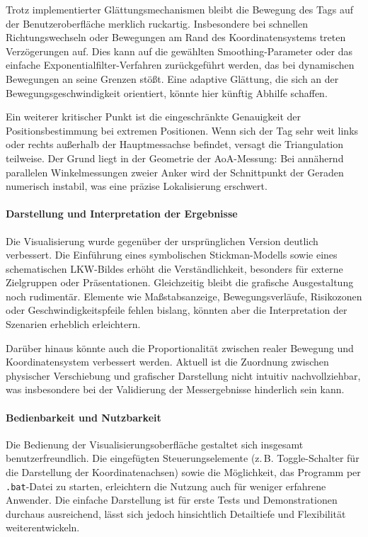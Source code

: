 \documentclass[a4paper, 12pt]{article} %
\begin{document}
Trotz implementierter Glättungsmechanismen bleibt die Bewegung des Tags auf der Benutzeroberfläche merklich ruckartig. Insbesondere bei 
schnellen Richtungswechseln oder Bewegungen am Rand des Koordinatensystems treten Verzögerungen auf. Dies kann auf die gewählten Smoothing-Parameter 
oder das einfache Exponentialfilter-Verfahren zurückgeführt werden, das bei dynamischen Bewegungen an seine Grenzen stößt. Eine adaptive Glättung, die 
sich an der Bewegungsgeschwindigkeit orientiert, könnte hier künftig Abhilfe schaffen.

Ein weiterer kritischer Punkt ist die eingeschränkte Genauigkeit der Positionsbestimmung bei extremen Positionen. Wenn sich der Tag sehr weit 
links oder rechts außerhalb der Hauptmessachse befindet, versagt die Triangulation teilweise. Der Grund liegt in der Geometrie der \ac{AoA}-Messung: 
Bei annähernd parallelen Winkelmessungen zweier Anker wird der Schnittpunkt der Geraden numerisch instabil, was eine präzise Lokalisierung erschwert.

\paragraph{Darstellung und Interpretation der Ergebnisse}

Die Visualisierung wurde gegenüber der ursprünglichen Version deutlich verbessert. Die Einführung eines symbolischen Stickman-Modells sowie 
eines schematischen \ac{LKW}-Bildes erhöht die Verständlichkeit, besonders für externe Zielgruppen oder Präsentationen. Gleichzeitig bleibt die 
grafische Ausgestaltung noch rudimentär. Elemente wie Maßstabsanzeige, Bewegungsverläufe, Risikozonen oder Geschwindigkeitspfeile fehlen bislang, 
könnten aber die Interpretation der Szenarien erheblich erleichtern.

Darüber hinaus könnte auch die Proportionalität zwischen realer Bewegung und Koordinatensystem verbessert werden. Aktuell ist die Zuordnung zwischen 
physischer Verschiebung und grafischer Darstellung nicht intuitiv nachvollziehbar, was insbesondere bei der Validierung der Messergebnisse hinderlich 
sein kann.

\paragraph{Bedienbarkeit und Nutzbarkeit}

Die Bedienung der Visualisierungsoberfläche gestaltet sich insgesamt benutzerfreundlich. Die eingefügten Steuerungselemente (z.\,B. Toggle-Schalter 
für die Darstellung der Koordinatenachsen) sowie die Möglichkeit, das Programm per \texttt{.bat}-Datei zu starten, erleichtern die Nutzung auch für 
weniger erfahrene Anwender. Die einfache Darstellung ist für erste Tests und Demonstrationen durchaus ausreichend, lässt sich jedoch hinsichtlich 
Detailtiefe und Flexibilität weiterentwickeln.
\end{document}
